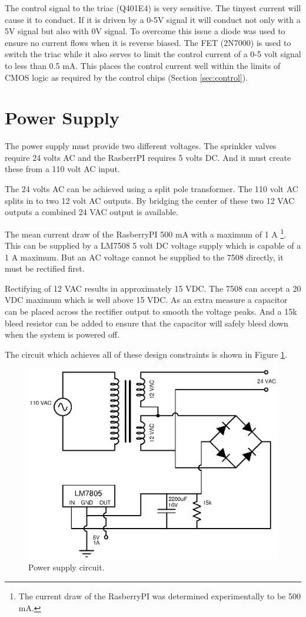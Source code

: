 \documentclass{article}
\begin{document}
The control signal to the triac (Q401E4) is very sensitive.
The tinyest current will cause it to conduct.
If it is driven by a 0-5V signal it will conduct not only
with a 5V signal but also with 0V signal.
To overcome this issue a diode was used to ensure no current
flows when it is reverse biased.
The FET (2N7000) is used to switch the triac while it also
serves to limit the control current of a 0-5 volt signal
to less than 0.5 mA.
This places the control current well within the limits
of CMOS logic as required by the control chips (Section \ref{sec:control}).


\clearpage
\section{Power Supply}
\label{sec:power}

The power supply must provide two different voltages.
The sprinkler valves require 24 volts AC and the
RasberrPI requires 5 volts DC.
And it must create these from a 110 volt AC input.

The 24 volts AC can be achieved using a split pole transformer.
The 110 volt AC splits in to two 12 volt AC outputs.
By bridging the center of these two 12 VAC outputs
a combined 24 VAC output is available.

The mean current draw of the RasberryPI 500 mA with a maximum of 1 A
\footnote{The current draw of the RasberryPI was determined experimentally to be 500 mA.}.
This can be supplied by a LM7508 5 volt DC voltage supply
which is capable of a 1 A maximum.
But an AC voltage cannot be supplied to the 7508 directly,
it must be rectified first.

Rectifying of 12 VAC results in approximately 15 VDC.
The 7508 can accept a 20 VDC maximum which is well above 15 VDC.
As an extra measure a capacitor can be placed across the
rectifier output to smooth the voltage peaks.
And a 15k bleed resistor can be added to ensure that the capacitor
will safely bleed down when the system is powered off.

The circuit which achieves all of these design constraints is
shown in Figure \ref{fig:power}.

\begin{figure}[hbp]
\centering
\includegraphics[scale=1.0]{xcircuit/power_supply}
\caption{Power supply circuit.}\label{fig:power}
\end{figure}


\pagebreak
\printbibliography
\end{document}
